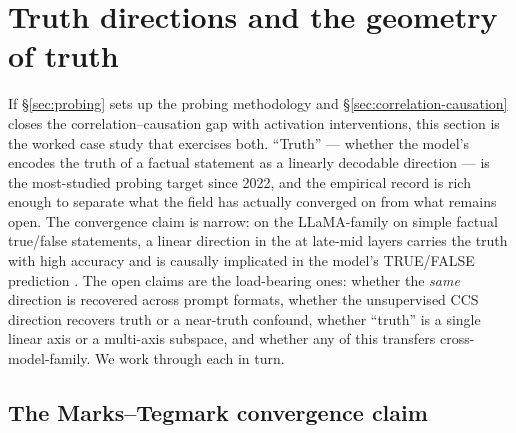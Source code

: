 
\section{Truth directions and the geometry of truth}
\label{sec:truth-directions}

If \S\ref{sec:probing} sets up the probing methodology and
\S\ref{sec:correlation-causation} closes the correlation--causation gap
with activation interventions, this section is the worked case study
that exercises both. ``Truth'' --- whether the model's 
encodes the truth  of a factual statement as a linearly decodable
direction --- is the most-studied probing target since 2022, and the
empirical record is rich enough to separate what the field has actually
converged on from what remains open. The convergence claim is narrow:
on the LLaMA-family on simple factual true/false statements, a linear
direction in the  at late-mid layers carries the truth
 with high  accuracy and is causally implicated in the
model's TRUE/FALSE prediction \citep{marks-tegmark-2023-truth}. The
open claims are the load-bearing ones: whether the \emph{same}
direction is recovered across prompt formats, whether the
unsupervised CCS direction recovers truth or a near-truth confound,
whether ``truth'' is a single linear axis or a multi-axis subspace,
and whether any of this transfers cross-model-family. We work through
each in turn.

\subsection{The Marks--Tegmark convergence claim}
\label{sec:truth-marks-tegmark}

